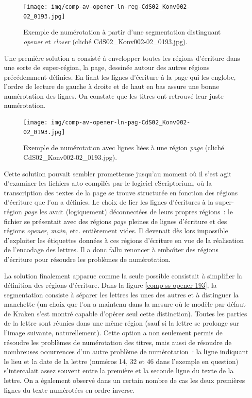 \documentclass[a4paper,12pt,twoside]{book}
\begin{document}
				\begin{figure}[!h]
					\centering
					\texttt{[image: img/comp-av-opener-ln-reg-CdS02\_Konv002-02\_0193.jpg]}
					\caption{Exemple de numérotation à partir d'une \gls{segmentation} distinguant \textit{opener} et \textit{closer} (cliché CdS02\_Konv002-02\_0193.jpg).}
					\label{comp-av-opener-ln-reg-193}
				\end{figure}
			
				Une première solution a consisté à envelopper toutes les régions d'écriture dans une sorte de super-région, la page, dessinée autour des autres régions précédemment définies. En liant les lignes d'écriture à la page qui les englobe, l'ordre de lecture de gauche à droite et de haut en bas assure une bonne numérotation des lignes. On constate que les titres ont retrouvé leur juste numérotation.
				
				\begin{figure}[!h]
					\centering
					\texttt{[image: img/comp-av-opener-ln-pag-CdS02\_Konv002-02\_0193.jpg]}
					\caption{Exemple de numérotation avec lignes liées à une région \textit{page} (cliché CdS02\_Konv002-02\_0193.jpg).}
					\label{annotation-page-66}
				\end{figure}
				
				Cette solution pouvait sembler prometteuse jusqu'au moment où il s'est agit d'examiner les fichiers \gls{alto} compilés par le logiciel eScriptorium, où la transcription des textes de la page se trouve structurée en fonction des régions d'écriture que l'on a définies. Le choix de lier les lignes d'écritures à la super-région \textit{page} les avait (logiquement) déconnectées de leurs propres régions~: le fichier se présentait avec des régions \textit{page} pleines de lignes d'écriture et des régions \textit{opener}, \textit{main}, etc. entièrement vides. Il devenait dès lors impossible d'exploiter les étiquettes données à ces régions d'écriture en vue de la réalisation de l'encodage des lettres. Il a donc fallu renoncer à emboîter des régions d'écriture pour résoudre les problèmes de numérotation.
				
				La solution finalement apparue comme la seule possible consistait à simplifier la définition des régions d'écriture. Dans la figure \ref{comp-ss-opener-193}, la \gls{segmentation} consiste à séparer les lettres les unes des autres et à distinguer la manchette (un choix que l'on a maintenu dans la mesure où le modèle par défaut de Kraken s'est montré capable d'opérer seul cette distinction). Toutes les parties de la lettre sont réunies dans une même région (sauf si la lettre se prolonge sur l'image suivante, naturellement). Cette option a non seulement permis de résoudre les problèmes de numérotation des titres, mais aussi de résoudre de nombreuses occurrences d'un autre problème de numérotation~: la ligne indiquant le lieu et la date de la lettre (numéros 14, 32 et 46 dans l'exemple en question) s'intercalait assez souvent entre la première et la seconde ligne du texte de la lettre. On a également observé dans un certain nombre de cas les deux premières lignes du texte numérotées en ordre inverse.
				
\end{document}
